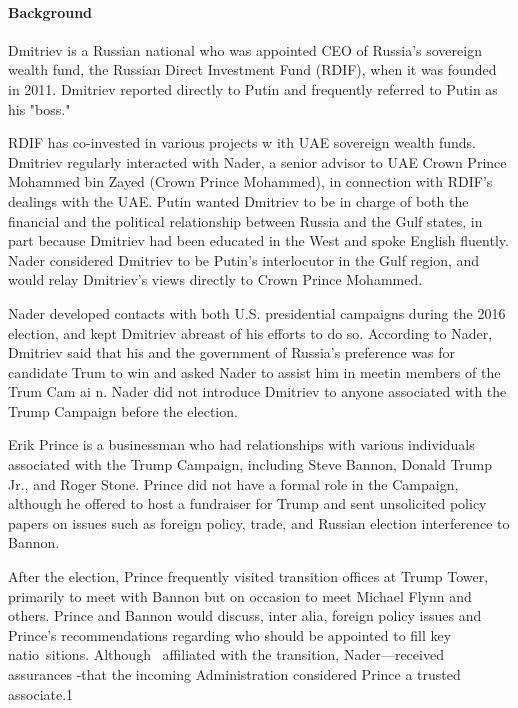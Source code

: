 \paragraph{Background}

Dmitriev is a Russian national who was appointed CEO of Russia's sovereign wealth fund, the Russian Direct Investment Fund (RDIF), when it was founded in 2011.%
Dmitriev reported directly to Putin and frequently referred to Putin as his "boss."%

RDIF has co-invested in various projects w ith UAE sovereign wealth funds.%
Dmitriev regularly interacted with Nader, a senior advisor to UAE Crown Prince Mohammed bin Zayed (Crown Prince Mohammed), in connection with RDIF's dealings with the UAE.%
Putin wanted Dmitriev to be in charge of both the financial and the political relationship between Russia and the Gulf states, in part because Dmitriev had been educated in the West and spoke English fluently.%
Nader considered Dmitriev to be Putin's interlocutor in the Gulf region, and would relay Dmitriev's views directly to Crown Prince Mohammed.%

Nader developed contacts with both U.S. presidential campaigns during the 2016 election, and kept Dmitriev abreast of his efforts to do so.%
According to Nader, Dmitriev said that his and the government of Russia's preference was for candidate Trum to win and asked Nader to assist him in meetin members of the Trum Cam ai n.%
Nader did not introduce Dmitriev to anyone associated with the Trump Campaign before the election.%

Erik Prince is a businessman who had relationships with various individuals associated with the Trump Campaign, including Steve Bannon, Donald Trump Jr., and Roger Stone.%
Prince did not have a formal role in the Campaign, although he offered to host a fundraiser for Trump and sent unsolicited policy papers on issues such as foreign policy, trade, and Russian election interference to Bannon.%

After the election, Prince frequently visited transition offices at Trump Tower, primarily to meet with Bannon but on occasion to meet Michael Flynn and others.%
Prince and Bannon would discuss, inter alia, foreign policy issues and Prince's recommendations regarding who should be appointed to fill key natio~sitions.%
Although~ affiliated with the transition, Nader---received assurances -that the incoming Administration considered Prince a trusted associate.1

